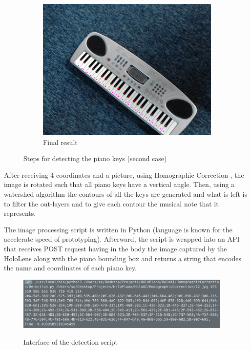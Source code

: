 \documentclass[12 pct]{report}
\begin{document}
\begin{figure}[H]
\begin{subfigure}[b]{0.7\linewidth}
    \includegraphics[width=\linewidth]{piano-pointsv2}
    \caption{Final result}
  \end{subfigure}
  \caption{Steps for detecting the piano keys (second case)}
  \label{fig:coffee3}
\end{figure}

After receiving 4 coordinates and a picture, using Homographic Correction \cite{opencvhomography}, the image is rotated such that all piano keys have a vertical angle. Then, using a watershed algorithm  \cite{wang2009image}  the contours of all the keys are generated and what is left is to filter the out-layers and to give each contour the musical note that it represents. 

The image processing script is written in Python \cite{oliphant2007python} (language is known for the accelerate speed of prototyping). Afterward, the script is wrapped into an API that receives POST request having in the body the image captured by the HoloLens along with the piano bounding box and returns a string that encodes the name and coordinates of each piano key.

\begin{figure}[H]
\includegraphics[width=0.95\textwidth]{holopiano-detection}
\centering
\label{fig:feature-points}
\caption{Interface of the detection script}
\end{figure}
\end{document}
